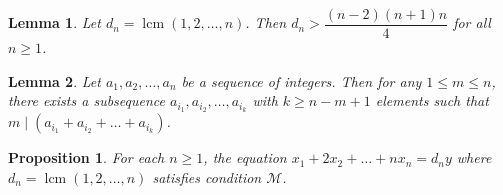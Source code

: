 \documentclass[10pt,a4paper]{amsart}
\newtheorem{lemma}{Lemma}
\newtheorem{proposition}{Proposition}
\DeclareMathOperator{\lcm}{lcm}
\begin{document}
\begin{lemma}
    \label{lem.combIneq}
    Let $d_n=\lcm(1,2,\ldots , n)$. Then $d_n >\dfrac{(n-2)(n+1)n}{4}$ for all $n\ge 1$.
\end{lemma}

\begin{lemma}
    \label{pigeonhole}
    Let $a_1,a_2,\ldots ,a_n$ be a sequence of integers. Then for any $1\le m \le n$, there exists a subsequence $a_{i_1},a_{i_2},\ldots ,a_{i_k}$ with $k\ge n-m+1$ elements such that $m \mid (a_{i_1}+a_{i_2}+\ldots +a_{i_k})$.
\end{lemma}

\begin{proposition}
    \label{prop.minSol}
    For each $n\ge 1$, the equation $x_1+2x_2+\ldots +nx_n=d_ny$ where $d_n=\lcm(1,2,\ldots , n)$ satisfies condition $\mathcal{M}$.
\end{proposition}
\end{document}
